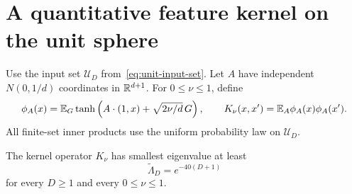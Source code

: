 \section{A quantitative feature kernel on the unit sphere}
\label{sec:sphere-direct-kernel}
Use the input set $\mathcal U_D$ from~\eqref{eq:unit-input-set}.
Let $A$ have independent $N(0,1/d)$ coordinates in $\mathbb R^{d+1}$. For $0\le\nu\le1$, define
\[
 \phi_A(x)=\mathbb E_G\tanh\left(A\cdot(1,x)+\sqrt{2\nu/d}\,G\right),
 \qquad K_\nu(x,x')=\mathbb E_A\phi_A(x)\phi_A(x').
\]
All finite-set inner products use the uniform probability law on $\mathcal U_D$.

\begin{lemma}
\label{lem:sphere-direct-kernel}
The kernel operator $K_\nu$ has smallest eigenvalue at least
\[
 \widetilde\Lambda_D=e^{-40(D+1)}
\]
for every $D\ge1$ and every $0\le\nu\le1$.
\end{lemma}
